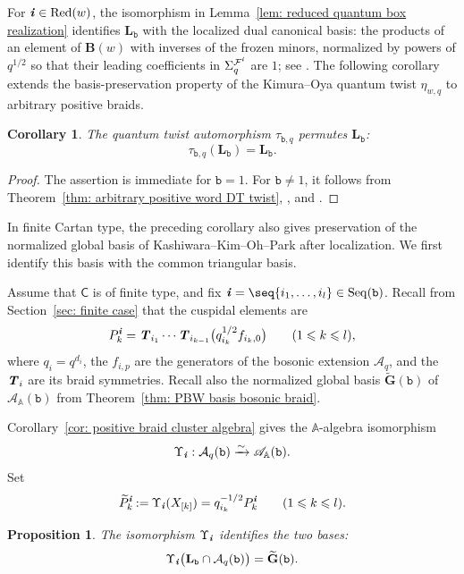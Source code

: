 \documentclass[12pt, leqno]{amsart}
\numberwithin{equation}{section}
\theoremstyle{plain}
\newtheorem{proposition}[lemma]{Proposition}
\newtheorem{corollary}[lemma]{Corollary}
\theoremstyle{definition}
\renewcommand{\le}{\leqslant}
\newcommand{\seteq}{\mathbin{:=}}
\newcommand{\ii}{ \textbf{\textit{i}}}
\newcommand{\sfC}{\mathsf{C}}
\newcommand{\bbA}{\mathbb{A}}
\newcommand{\bfB}{\mathbf{B}}
\newcommand{\bfG}{\mathbf{G}}
\newcommand{\bfL}{\mathbf{L}}
\newcommand{\tbfG}{\widetilde{\bfG}}
\newcommand{\calA}{\mathcal{A}}
\newcommand{\calF}{\mathcal{F}}
\newcommand{\scrA}{\mathscr{A}}
\newcommand{\ttb}{\mathtt{b}}
\newcommand{\TT}{ \textbf{\textit{T}}}
\newcommand{\Red}{\mathrm{Red}}
\newcommand{\Seq}{\mathrm{Seq}}
\begin{document}
For $\ii\in\Red(w)$, the isomorphism in
Lemma~\ref{lem: reduced quantum box realization} identifies
$\bfL_\ttb$ with the localized dual canonical basis:
the products of an element of $\bfB(w)$ with inverses of the
frozen minors, normalized by powers of $q^{1/2}$ so that their
leading coefficients in $\Sigma_q^{\calF^\ii}$ are $1$; see
\cite[Theorems~9.3.2 and~9.5.1]{Qin20}.
The following corollary extends the basis-preservation property
of the Kimura--Oya quantum twist $\eta_{w,q}$ \cite[Theorem~6.1]{KimuraOya21}
to arbitrary positive braids.

\begin{corollary}
\label{prop: positive braid twist common triangular basis}
The quantum twist automorphism $\tau_{\ttb,q}$ permutes
$\bfL_\ttb$:
\[
\tau_{\ttb,q}(\bfL_\ttb)=\bfL_\ttb.
\]
\end{corollary}

\begin{proof}
The assertion is immediate for $\ttb=1$.
For $\ttb\ne1$, it follows from
Theorem~\ref{thm: arbitrary positive word DT twist},
\cite[Theorem~6.14]{Qin24A}, and
\cite[Section~6.1 and Theorem~6.2(2)]{KimuraQinWei}.
\end{proof}




 
In finite Cartan type, the preceding corollary also gives preservation
of the normalized global basis of Kashiwara--Kim--Oh--Park
\cite{KKOP24} after localization.
We first identify this basis with the common triangular basis.

Assume that $\sfC$ is of finite type, and fix
$\ii=\seq{i_1,\ldots,i_l}\in\Seq(\ttb)$.
Recall from Section~\ref{sec: finite case} that the cuspidal elements are
\[
P_k^\ii=\TT_{i_1}\cdots\TT_{i_{k-1}}
\bigl(q_{i_k}^{1/2}f_{i_k,0}\bigr)
\qquad(1\le k\le l),
\]
where $q_i=q^{d_i}$, the $f_{i,p}$ are the generators of the
bosonic extension $\scrA_q$, and the $\TT_i$ are its braid
symmetries.
Recall also the normalized global basis $\tbfG(\ttb)$ of
$\scrA_\bbA(\ttb)$ from
Theorem~\ref{thm: PBW basis bosonic braid}.

Corollary~\ref{cor: positive braid cluster algebra} gives the
$\bbA$-algebra isomorphism
\[
\Upsilon_\ii:\calA_q(\ttb)\xrightarrow{\sim}\scrA_\bbA(\ttb).
\]
Set
\[
\widetilde P_k^\ii\seteq\Upsilon_\ii(X_{[k]})
=q_{i_k}^{-1/2}P_k^\ii
\qquad(1\le k\le l).
\]

\begin{proposition}
\label{prop: KKOP common triangular basis identification}
The isomorphism $\Upsilon_\ii$ identifies the two bases:
\[
\Upsilon_\ii\bigl(\bfL_\ttb\cap\calA_q(\ttb)\bigr)
=\tbfG(\ttb).
\]
\end{proposition}
\end{document}

